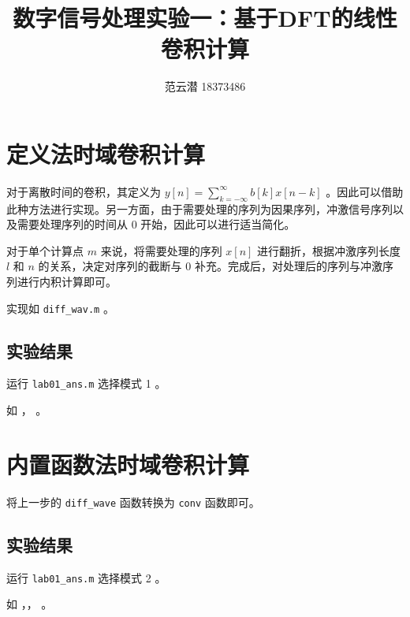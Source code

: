 \documentclass[lang=cn,11pt,a4paper,cite=authoryear]{elegantpaper}
\title{数字信号处理实验一：基于DFT的线性卷积计算}
\author{范云潜 18373486}
\institute{微电子学院 184111 班}
\date{\zhtoday}
\begin{document}
\maketitle


\tableofcontents

\listoffigures

\section{定义法时域卷积计算}

对于离散时间的卷积，其定义为 \(y[n] = \sum_{k = -\infty}^\infty b[k] x[n - k]\) 。因此可以借助此种方法进行实现。另一方面，由于需要处理的序列为因果序列，冲激信号序列以及需要处理序列的时间从 \(0\) 开始，因此可以进行适当简化。

对于单个计算点 \(m\) 来说，将需要处理的序列 \(x[n]\) 进行翻折，根据冲激序列长度 \(l\) 和 \(n\) 的关系，决定对序列的截断与 \(0\) 补充。完成后，对处理后的序列与冲激序列进行内积计算即可。

实现如 \lstinline{diff_wav.m} 。

\subsection{实验结果}

运行 \lstinline{lab01_ans.m} 选择模式 1 。

如 ， 。



\section{内置函数法时域卷积计算}

将上一步的 \lstinline{diff_wave} 函数转换为 \lstinline{conv} 函数即可。


\subsection{实验结果}

运行 \lstinline{lab01_ans.m} 选择模式 2 。

如 ，， 。


\end{document}
